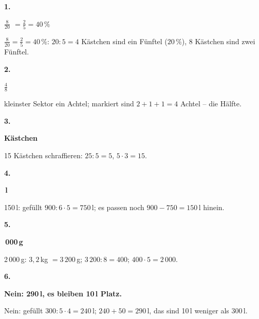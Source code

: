 \documentclass[11pt]{article}
\newcommand{\lsg}[3]{\par\noindent\begin{minipage}[t]{9mm}\textbf{#1}\end{minipage}%
  \begin{minipage}[t]{52mm}\raggedright\bfseries\boldmath #2\end{minipage}\hspace{3mm}%
  \begin{minipage}[t]{\dimexpr\linewidth-64mm\relax}\raggedright\small #3\end{minipage}\par\vspace{4pt}}
\begin{document}
\par\Needspace{25mm}\vspace{6pt}\noindent\colorbox{black!12}{}\hspace{2mm}{\bfseries Probetest}\par\vspace{4pt}
\lsg{1.}{$\frac{8}{20}$ $= \frac{2}{5} = 40\,\%$}{$\frac{8}{20} = \frac{2}{5} = 40\,\%$: $20 : 5 = 4$ Kästchen sind ein Fünftel ($20\,\%$), 8 Kästchen sind zwei Fünftel.}
\lsg{2.}{$\frac{4}{8}$}{kleinster Sektor ein Achtel; markiert sind $2 + 1 + 1 = 4$ Achtel – die Hälfte.}
\lsg{3.}{15 Kästchen}{15 Kästchen schraffieren: $25 : 5 = 5$, $5 \cdot 3 = 15$.}
\lsg{4.}{150\,l}{150\,l: gefüllt $900 : 6 \cdot 5 = 750$\,l; es passen noch $900 - 750 = 150$\,l hinein.}
\lsg{5.}{2\,000\,g}{2\,000\,g: $3{,}2$\,kg $= 3\,200$\,g; $3\,200 : 8 = 400$; $400 \cdot 5 = 2\,000$.}
\lsg{6.}{Nein: 290\,l, es bleiben 10\,l Platz.}{Nein: gefüllt $300 : 5 \cdot 4 = 240$\,l; $240 + 50 = 290$\,l, das sind 10\,l weniger als 300\,l.}
\end{document}
